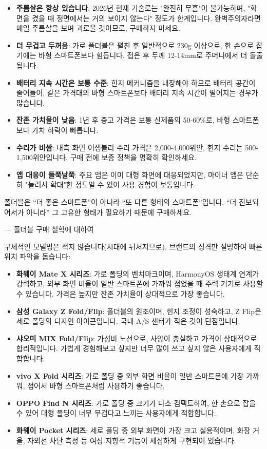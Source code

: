 \begin{itemize}
  \item \textbf{주름살은 항상 있습니다}: 2026년 현재 기술로는 "완전히 무흠"이 불가능하며, "화면을 켰을 때 정면에서는 거의 보이지 않는다" 정도가 한계입니다. 완벽주의자라면 매일 주름살을 보며 괴로울 것이므로, 구매하지 마세요.
  \item \textbf{더 무겁고 두꺼움}: 가로 폴더블은 펼친 후 일반적으로 230g 이상으로, 한 손으로 잡기에는 바형 스마트폰보다 힘듭니다. 접은 후 두께 12-14mm로 주머니에서 더 돌출됩니다.
  \item \textbf{배터리 지속 시간은 보통 수준}: 힌지 메커니즘을 내장해야 하므로 배터리 공간이 줄어들어, 같은 가격대의 바형 스마트폰보다 배터리 지속 시간이 떨어지는 경우가 많습니다.
  \item \textbf{잔존 가치율이 낮음}: 1년 후 중고 가격은 보통 신제품의 50-60\%로, 바형 스마트폰보다 가치 하락이 빠릅니다.
  \item \textbf{수리가 비쌈}: 내측 화면 어셈블리 수리 가격은 2,000-4,000위안, 힌지 수리는 500-1,500위안입니다. 구매 전에 보증 정책을 명확히 확인하세요.
  \item \textbf{앱 대응이 들쭉날쭉}: 주요 앱은 이미 대형 화면에 대응되었지만, 마이너 앱은 단순히 "늘려서 확대"한 정도일 수 있어 사용 경험이 보통입니다.
\end{itemize}

폴더블은 “더 좋은 스마트폰”이 아니라 “또 다른 형태의 스마트폰”입니다. “더 진보되어서가 아니라” 그 고유한 형태가 필요하기 때문에 구매하세요.

— 폴더블 구매 철학에 대하여


구체적인 모델명은 적지 않습니다(시대에 뒤처지므로), 브랜드의 성격만 설명하여 빠른 위치 파악을 돕습니다:

\begin{itemize}
  \item \textbf{화웨이 Mate X 시리즈}: 가로 폴딩의 벤치마크이며, HarmonyOS 생태계 연계가 강력하고, 외부 화면 비율이 일반 스마트폰에 가까워 접었을 때 주력 기기로 사용할 수 있습니다. 가격은 높지만 잔존 가치율이 상대적으로 가장 좋습니다.
  \item \textbf{삼성 Galaxy Z Fold/Flip}: 폴더블의 원조이며, 힌지 조정이 성숙하고, Z Flip은 세로 폴딩의 디자인 아이콘입니다. 국내 A/S 센터가 적은 것이 단점입니다.
  \item \textbf{샤오미 MIX Fold/Flip}: 가성비 노선으로, 사양이 충실하고 가격이 상대적으로 합리적입니다. 가볍게 경험해보고 싶지만 너무 많이 쓰고 싶지 않은 사용자에게 적합합니다.
  \item \textbf{vivo X Fold 시리즈}: 가로 폴딩 중 외부 화면 비율이 일반 스마트폰에 가장 가까워, 접어서 바형 스마트폰처럼 사용하기 좋습니다.
  \item \textbf{OPPO Find N 시리즈}: 가로 폴딩 중 크기가 다소 컴팩트하여, 한 손으로 잡을 수 있어 대형 폴딩이 너무 무겁다고 느끼는 사용자에게 적합합니다.
  \item \textbf{화웨이 Pocket 시리즈}: 세로 폴딩 중 외부 화면이 가장 크고 실용적이며, 화장 거울, 자외선 차단 측정 등 여성 지향적 기능이 세심하게 구현되어 있습니다.
\end{itemize}

